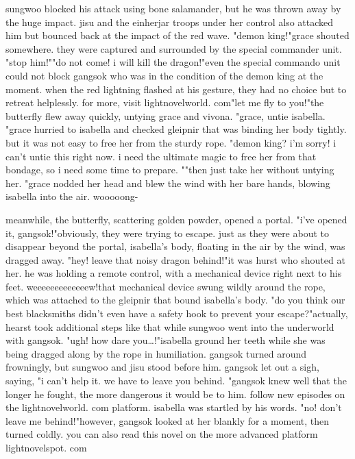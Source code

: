 sungwoo blocked his attack using bone salamander, but he was thrown away by the huge impact.
jisu and the einherjar troops under her control also attacked him but bounced back at the impact of the red wave.
"demon king!"grace shouted somewhere.
 they were captured and surrounded by the special commander unit.
"stop him!""do not come! i will kill the dragon!"even the special commando unit could not block gangsok who was in the condition of the demon king at the moment.
when the red lightning flashed at his gesture, they had no choice but to retreat helplessly.
for more, visit lightnov‌elworld.
com"let me fly to you!"the butterfly flew away quickly, untying grace and vivona.
"grace, untie isabella.
"grace hurried to isabella and checked gleipnir that was binding her body tightly.
but it was not easy to free her from the sturdy rope.
"demon king? i'm sorry! i can't untie this right now.
 i need the ultimate magic to free her from that bondage, so i need some time to prepare.
""then just take her without untying her.
"grace nodded her head and blew the wind with her bare hands, blowing isabella into the air.
wooooong-

meanwhile, the butterfly, scattering golden powder, opened a portal.
"i've opened it, gangsok!"obviously, they were trying to escape.
 just as they were about to disappear beyond the portal, isabella's body, floating in the air by the wind, was dragged away.
"hey! leave that noisy dragon behind!"it was hurst who shouted at her.
 he was holding a remote control, with a mechanical device right next to his feet.
weeeeeeeeeeeeew!that mechanical device swung wildly around the rope, which was attached to the gleipnir that bound isabella's body.
"do you think our best blacksmiths didn't even have a safety hook to prevent your escape?"actually, hearst took additional steps like that while sungwoo went into the underworld with gangsok.
"ugh! how dare you…!"isabella ground her teeth while she was being dragged along by the rope in humiliation.
gangsok turned around frowningly, but sungwoo and jisu stood before him.
gangsok let out a sigh, saying, "i can't help it.
 we have to leave you behind.
"gangsok knew well that the longer he fought, the more dangerous it would be to him.
follow new episodes on the lightnov­elworld.
c­om platform.
isabella was startled by his words.
"no! don't leave me behind!"however, gangsok looked at her blankly for a moment, then turned coldly.
 you can also read this novel on the more advanced platform lightnovelspot.
com

 
